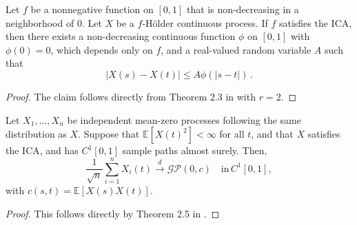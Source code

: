 \begin{proposition}\label{prop:lipschitz}
    Let $f$ be a nonnegative function on $[0, 1]$ that is non-decreasing in a
    neighborhood of $0$. Let $X$ be a $f$-H\"older continuous process. If $f$ satisfies
    the ICA, then there exists a non-decreasing continuous function $\phi$ on $[0, 1]$
    with $\phi(0) = 0$, which depends only on $f$, and a real-valued random variable $A$
    such that
    \[
        |X(s) - X(t)| \leq A \phi(|s - t|) \,.
    \]
\end{proposition}
\begin{proof}
    The claim follows directly from Theorem 2.3 in \cite{hahn1977} with $r = 2$.
\end{proof}


\begin{theorem}\label{thm:fclt}
    Let $X_1, \dots, X_n$ be independent mean-zero processes following the same
    distribution as $X$. Suppose that $\mathbb{E}[X(t)^2] < \infty$ for all $t$, and
    that $X$ satisfies the ICA, and has $C^1[0, 1]$ sample paths almost surely. Then,
    \[
        \frac{1}{\sqrt{n}} \sum_{i = 1}^n X_i(t) \overset{d}{\to} \mathcal{GP}(0, c)
        \quad \text{in} \, C^1[0, 1],
    \]
    with $c(s, t) = \mathbb{E}[X(s) X(t)]$.
\end{theorem}
\begin{proof}
    This follows directly by Theorem 2.5 in \cite{hahn1977}.
\end{proof}


